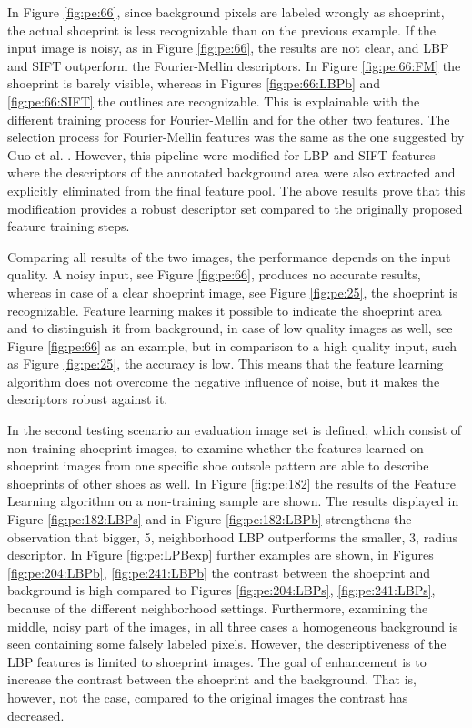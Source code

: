 \documentclass[draft,final]{vutinfth} %
\begin{document}
\par
In Figure \ref{fig:pe:66}, since background pixels are labeled wrongly as shoeprint, the actual shoeprint is less recognizable than on the previous example.
If the input image is noisy, as in Figure \ref{fig:pe:66}, the results are not clear, and LBP and SIFT outperform the Fourier-Mellin descriptors.
In Figure \ref{fig:pe:66:FM} the shoeprint is barely visible, whereas in Figures \ref{fig:pe:66:LBPb} and \ref{fig:pe:66:SIFT} the outlines are recognizable.
This is explainable with the different training process for Fourier-Mellin and for the other two features.
The selection process for Fourier-Mellin features was the same as the one suggested by Guo et al. \cite{guo2012discriminative}.
However, this pipeline were modified for LBP and SIFT features where the descriptors of the annotated background area were also extracted and explicitly eliminated from the final feature pool.
The above results prove that this modification provides a robust descriptor set compared to the originally proposed feature training steps.
\par
Comparing all results of the two images, the performance depends on the input quality.
A noisy input, see Figure \ref{fig:pe:66}, produces no accurate results, whereas in case of a clear shoeprint image, see Figure \ref{fig:pe:25}, the shoeprint is recognizable.
Feature learning makes it possible to indicate the shoeprint area and to distinguish it from background, in case of low quality images as well, see Figure \ref{fig:pe:66} as an example, but in comparison to a high quality input, such as Figure \ref{fig:pe:25}, the accuracy is low.
This means that the feature learning algorithm does not overcome the negative influence of noise, but it makes the descriptors robust against it.
\par
In the second testing scenario an evaluation image set is defined, which consist of non-training shoeprint images, to examine whether the features learned on shoeprint images from one specific shoe outsole pattern are able to describe shoeprints of other shoes as well.
In Figure \ref{fig:pe:182} the results of the Feature Learning algorithm on a non-training sample are shown.
The results displayed in Figure \ref{fig:pe:182:LBPs} and in Figure \ref{fig:pe:182:LBPb} strengthens the observation that bigger, 5, neighborhood LBP outperforms the smaller, 3, radius descriptor.
In Figure \ref{fig:pe:LPBexp} further examples are shown, in Figures \ref{fig:pe:204:LBPb}, \ref{fig:pe:241:LBPb} the contrast between the shoeprint and background is high compared to Figures \ref{fig:pe:204:LBPs}, \ref{fig:pe:241:LBPs}, because of the different neighborhood settings.
Furthermore, examining the middle, noisy part of the images, in all three cases a homogeneous background is seen containing some falsely labeled pixels.
However, the descriptiveness of the LBP features is limited to shoeprint images.
The goal of enhancement is to increase the contrast between the shoeprint and the background.
That is, however, not the case, compared to the original images the contrast has decreased.
\end{document}
